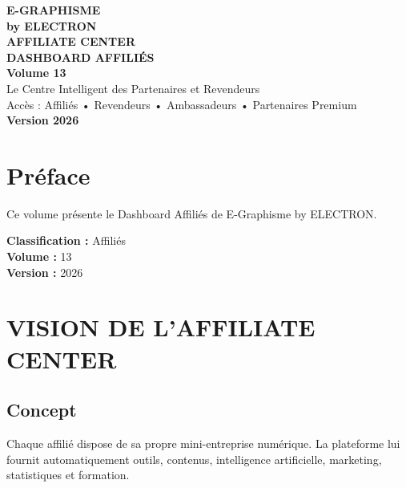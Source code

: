 \documentclass[12pt,a4paper,oneside]{book}
\begin{document}
\begin{titlepage}
\thispagestyle{empty}
\begin{center}
\vspace*{2cm}
{\Huge\bfseries\color{bleuIA}E-GRAPHISME}\\[0.3cm]
{\LARGE\bfseries\color{violet}by ELECTRON}\\[2cm]
\vspace{2cm}
{\huge\bfseries\color{noir}AFFILIATE CENTER}\\[0.3cm]
{\huge\bfseries\color{noir}DASHBOARD AFFILIÉS}\\[1cm]
{\Large\bfseries\color{cyan}Volume 13}\\[3cm]
\vspace{2cm}
{\Large\color{gris}Le Centre Intelligent des Partenaires et Revendeurs}\\[0.5cm]
{\Large\color{gris}Accès : Affiliés • Revendeurs • Ambassadeurs • Partenaires Premium}\\[3cm]
{\Large\bfseries\color{or}Version 2026}\\[2cm]
\vfill
\end{center}
\end{titlepage}

\frontmatter

\chapter*{Préface}
Ce volume présente le Dashboard Affiliés de E-Graphisme by ELECTRON.

\bigskip
\textbf{Classification :} Affiliés\\
\textbf{Volume :} 13\\
\textbf{Version :} 2026

\tableofcontents

\mainmatter

\chapter{VISION DE L'AFFILIATE CENTER}

\section{Concept}
Chaque affilié dispose de sa propre mini-entreprise numérique. La plateforme lui fournit automatiquement outils, contenus, intelligence artificielle, marketing, statistiques et formation.
\end{document}
